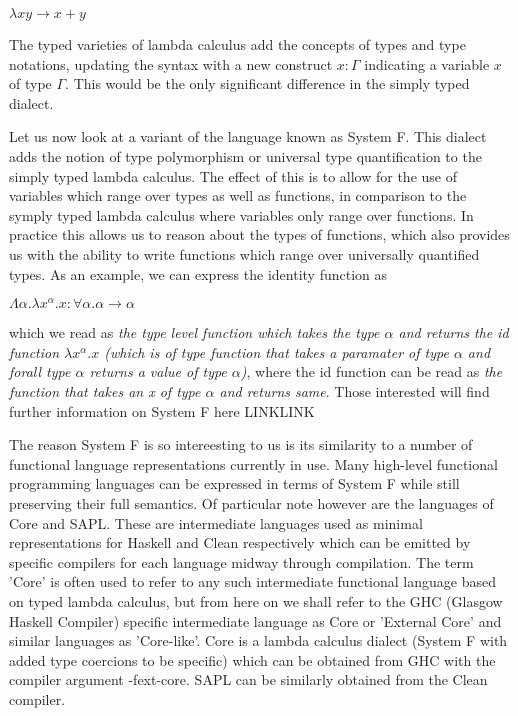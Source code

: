 \documentclass[11pt]{article}
\begin{document}
\begin{center} 
	\( \lambda x y \rightarrow x + y \)
\end{center}

\noindent The typed varieties of lambda calculus add the concepts of types and type
notations, updating the syntax with a new construct \(x:\Gamma \) indicating
a variable \(x\) of type \(\Gamma\). This would be the only significant 
difference in the simply typed dialect. 

Let us now look at a variant of the language known as System F. This dialect
adds the notion of type polymorphism or universal type quantification to 
the simply typed lambda calculus. The effect of this is to allow for the
use of variables which range over types as well as functions, in comparison
to the symply typed lambda calculus where variables only range over functions.
In practice this allows us to reason about the types of functions, which also
provides us with the ability to write functions which range over universally
quantified types. As an example, we can express the identity function as

\begin{center}
 \( \Lambda \alpha . \lambda x^\alpha . x : \forall \alpha . \alpha \rightarrow \alpha  \)
\end{center}

\noindent which we read as \emph{the type level function which takes 
the type \(\alpha\) and returns the id function \( \lambda x^\alpha . x \)
(which is of type \emph{ function that takes a paramater of type \( \alpha \) 
and forall type \(\alpha\) returns a value of type \( \alpha \)})}, where 
the id function can be read as \emph{the function that takes an x of 
type \( \alpha \) and returns same}. Those interested will find further information
on System F here LINKLINK

The reason System F is so intereesting to us is its similarity to a number of functional
language representations currently in use. Many high-level functional programming languages
can be expressed in terms of System F while still preserving their full semantics. Of
particular note however are the languages of Core and SAPL. These are intermediate languages
used as minimal representations for Haskell and Clean respectively which can be emitted by
specific compilers for each language midway through compilation. The term 'Core' is often
used to refer to any such intermediate functional language based on typed lambda calculus,
but from here on we shall refer to the GHC (Glasgow Haskell Compiler) specific intermediate
language as Core or 'External Core' and similar languages as 'Core-like'. Core is a lambda
calculus dialect (System F with added type coercions to be specific) which can be obtained
from GHC with the compiler argument -fext-core. SAPL can be similarly obtained from the 
Clean compiler. 
\end{document}
